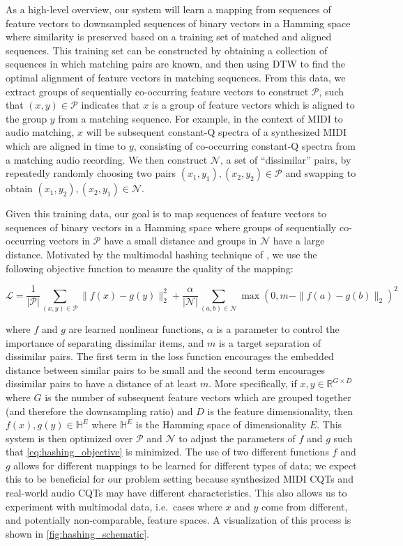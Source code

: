 As a high-level overview, our system will learn a mapping from sequences of feature vectors to downsampled sequences of binary vectors in a Hamming space where similarity is preserved based on a training set of matched and aligned sequences.
This training set can be constructed by obtaining a collection of sequences in which matching pairs are known, and then using DTW to find the optimal alignment of feature vectors in matching sequences.
From this data, we extract groups of sequentially co-occurring feature vectors to construct $\mathcal{P}$, such that $(x, y) \in \mathcal{P}$ indicates that $x$ is a group of feature vectors which is aligned to the group $y$ from a matching sequence.
For example, in the context of MIDI to audio matching, $x$ will be subsequent constant-Q spectra of a synthesized MIDI which are aligned in time to $y$, consisting of co-occurring constant-Q spectra from a matching audio recording.
We then construct $\mathcal{N}$, a set of ``dissimilar'' pairs, by repeatedly randomly choosing two pairs $(x_1, y_1), (x_2, y_2) \in \mathcal{P}$ and swapping to obtain $(x_1, y_2), (x_2, y_1) \in \mathcal{N}$.

Given this training data, our goal is to map sequences of feature vectors to sequences of binary vectors in a Hamming space where groups of sequentially co-occurring vectors in $\mathcal{P}$ have a small distance and groups in $\mathcal{N}$ have a large distance.
Motivated by the multimodal hashing technique of \cite{masci2014multimodal}, we use the following objective function to measure the quality of the mapping:

\begin{equation}
\mathcal{L} = \frac{1}{|\mathcal{P}|} \sum_{(x, y) \in \mathcal{P}} \| f(x) - g(y) \|_2^2  + \frac{\alpha}{|\mathcal{N}|} \sum_{(a, b) \in \mathcal{N}} \max(0, m - \|f(a) - g(b) \|_2)^2
\label{eq:hashing_objective}
\end{equation}

where $f$ and $g$ are learned nonlinear functions, $\alpha$ is a parameter to control the importance of separating dissimilar items, and $m$ is a target separation of dissimilar pairs.
The first term in the loss function encourages the embedded distance between similar pairs to be small and the second term encourages dissimilar pairs to have a distance of at least $m$.
More specifically, if $x, y \in \mathbb{R}^{G \times D}$ where $G$ is the number of subsequent feature vectors which are grouped together (and therefore the downsampling ratio) and $D$ is the feature dimensionality, then $f(x), g(y) \in \mathbb{H}^E$ where $\mathbb{H}^E$ is the Hamming space of dimensionality $E$.
This system is then optimized over $\mathcal{P}$ and $\mathcal{N}$ to adjust the parameters of $f$ and $g$ such that \cref{eq:hashing_objective} is minimized.
The use of two different functions $f$ and $g$ allows for different mappings to be learned for different types of data; we expect this to be beneficial for our problem setting because synthesized MIDI CQTs and real-world audio CQTs may have different characteristics.
This also allows us to experiment with multimodal data, i.e.\ cases where $x$ and $y$ come from different, and potentially non-comparable, feature spaces.
A visualization of this process is shown in \cref{fig:hashing_schematic}.

